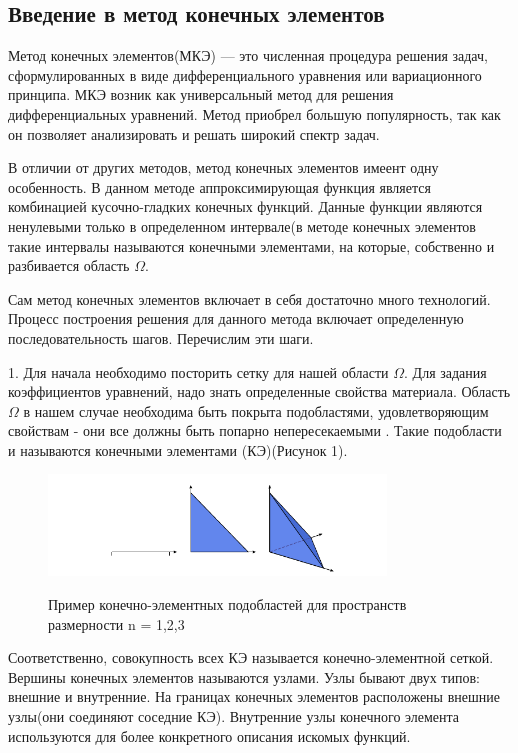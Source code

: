 \subsection{Введение в метод конечных элементов}

Метод конечных элементов(МКЭ) — это численная процедура решения задач,
сформулированных в виде дифференциального уравнения или вариационного 
принципа.\cite{bib:thomas}
МКЭ возник как универсальный метод для решения дифференциальных уравнений. 
Метод приобрел большую популярность, так как он позволяет анализировать и
решать широкий спектр задач.


В отличии от других методов, метод конечных элементов имеент одну особенность.
В данном методе аппроксимирующая функция является комбинацией кусочно-гладких конечных функций.
Данные функции являются ненулевыми только в определенном интервале(в методе конечных элементов такие интервалы
называются конечными элементами, на которые, собственно и разбивается область $\Omega$.

Сам метод конечных элементов включает в себя достаточно много технологий. 
Процесс построения решения для данного метода включает
определенную последовательность шагов. Перечислим эти шаги.

1. Для начала необходимо посторить сетку для нашей области $\Omega$.
Для задания коэффициентов уравнений, надо знать определенные свойства материала.
Область $\Omega$ в нашем случае необходима быть покрыта подобластями, удовлетворяющим свойствам - 
они все должны быть попарно непересекаемыми \cite{bib:thomas}. Такие подобласти и называются конечными элементами (КЭ)(Рисунок 1).

\renewcommand{\figurename}{Рисунок}
\begin{figure}[H]
      \centering
      \includegraphics[width=0.8\textwidth]{./pics/random-cells.png}\\
      \centering\caption{Пример конечно-элементных подобластей для пространств размерности n = 1,2,3}
\end{figure}
Соответственно, совокупность всех КЭ называется конечно-элементной сеткой\cite{bib:logg}.
Вершины конечных элементов называются узлами. Узлы бывают двух типов: внешние и внутренние.
На границах конечных элементов расположены внешние узлы(они соединяют соседние КЭ).
Внутренние узлы конечного элемента используются для более конкретного описания искомых функций.

